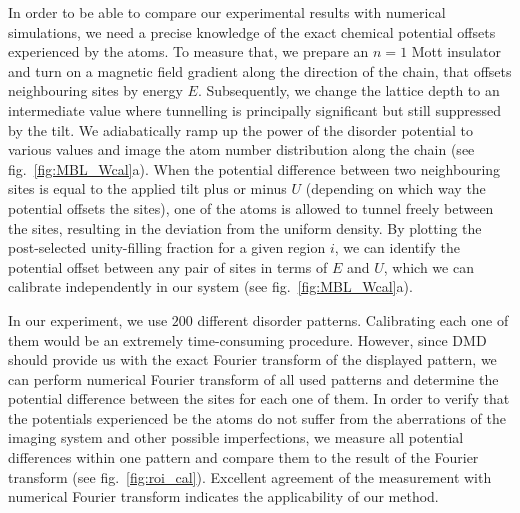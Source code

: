 In order to be able to compare our experimental results with numerical simulations, we need a precise knowledge of the exact chemical potential offsets experienced by the atoms. To measure that, we prepare an $n=1$ Mott insulator and turn on a magnetic field gradient along the direction of the chain, that offsets neighbouring sites by energy $E$. Subsequently, we change the lattice depth to an intermediate value where tunnelling is principally significant but still suppressed by the tilt. We adiabatically ramp up the power of the disorder potential to various values and image the atom number distribution along the chain (see fig.~\ref{fig:MBL_Wcal}a). When the potential difference between two neighbouring sites is equal to the applied tilt plus or minus $U$ (depending on which way the potential offsets the sites), one of the atoms is allowed to tunnel freely between the sites, resulting in the deviation from the uniform density. By plotting the post-selected unity-filling fraction for a given region $i$, we can identify the potential offset between any pair of sites in terms of $E$ and $U$, which we can calibrate independently in our system \cite{Ma2011} (see fig.~\ref{fig:MBL_Wcal}a).

In our experiment, we use $200$ different disorder patterns. Calibrating each one of them would be an extremely time-consuming procedure. However, since DMD should provide us with the exact Fourier transform of the displayed pattern, we can perform numerical Fourier transform of all used patterns and determine the potential difference between the sites for each one of them. In order to verify that the potentials experienced be the atoms do not suffer from the aberrations of the imaging system and other possible imperfections, we measure all potential differences within one pattern and compare them to the result of the Fourier transform (see fig.~\ref{fig:roi_cal}). Excellent agreement of the measurement with numerical Fourier transform indicates the applicability of our method.

